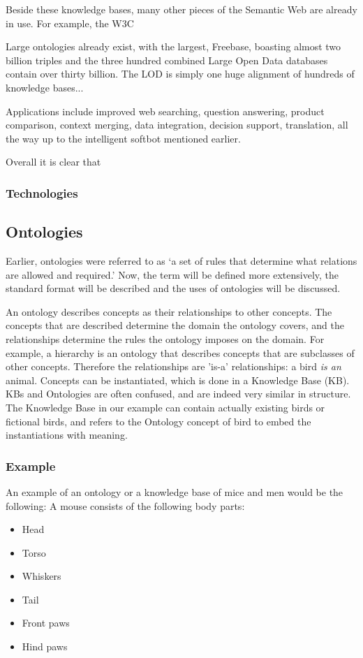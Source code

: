 \documentclass{article}
\begin{document}
 Beside these knowledge bases, many other pieces of the Semantic Web are already in use. For example, the W3C \cite{rdf, owl}
 
 Large ontologies already exist, with the largest, Freebase, boasting almost two billion triples and the three hundred combined Large Open Data databases contain over thirty billion\cite{dbpedia, lod}. The LOD is simply one huge alignment of hundreds of knowledge bases... %
 
 Applications include improved web searching, question answering, product comparison, context merging, data integration, decision support, translation, all the way up to the intelligent softbot mentioned earlier. %
 
 
 Overall it is clear that %
 \subsubsection{Technologies}
 
 
 \subsection{Ontologies}
 Earlier, ontologies were referred to as `a set of rules that determine what relations are allowed and required.' Now, the term will be defined more extensively, the standard format will be described and the uses of ontologies will be discussed.
 
 An ontology describes concepts as their relationships to other concepts. The concepts that are described determine the domain the ontology covers, and the relationships determine the rules the ontology imposes on the domain. For example, a hierarchy is an ontology that describes concepts that are subclasses of other concepts. Therefore the relationships are 'is-a' relationships: a bird \emph{is an} animal.
 Concepts can be instantiated, which is done in a Knowledge Base (KB). KBs and Ontologies are often confused, and are indeed very similar in structure. The Knowledge Base in our example can contain actually existing birds or fictional birds, and refers to the Ontology concept of bird to embed the instantiations with meaning\cite{ontologyGuru}.
 
 \subsubsection{Example} \label{example}
 An example of an ontology or a knowledge base of mice and men would be the following:
 A mouse consists of the following body parts:
 \begin{itemize}
 \item Head
 \item Torso
 \item Whiskers
 \item Tail
 \item Front paws
 \item Hind paws
 \end{itemize}
 
\end{document}
